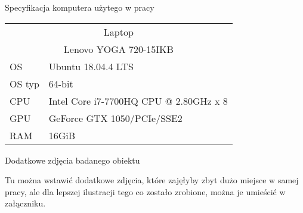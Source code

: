 \begin{easyappendix}{Specyfikacja komputera użytego w pracy}


\begin{tabular}{ |p{2cm}||p{10cm}|  }
 \hline
 \multicolumn{2}{|c|}{Laptop} \\
 \multicolumn{2}{|c|}{Lenovo YOGA 720-15IKB} \\
 \hline
 OS & Ubuntu 18.04.4 LTS\\
 OS typ & 64-bit\\
 CPU & Intel Core i7-7700HQ CPU @ 2.80GHz x 8\\
 GPU & GeForce GTX 1050/PCIe/SSE2\\
 RAM & 16GiB\\
 \hline
\end{tabular}


\end{easyappendix}

\begin{easyappendix}{Dodatkowe zdjęcia badanego obiektu}

Tu można wstawić dodatkowe zdjęcia, które zajęłyby zbyt dużo miejsce w samej pracy, ale dla lepszej ilustracji tego co zostało zrobione, można je umieścić w załączniku.



\end{easyappendix}

